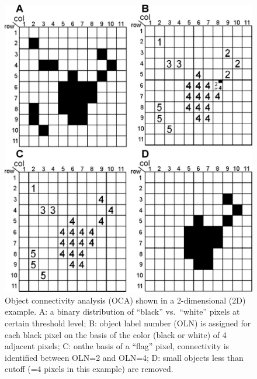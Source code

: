 \begin{figure}[p]
	\centering
	\includegraphics[width=\imsize]{img/Tsuda2008/Tsuda-03}
	\caption[Object connectivity analysis]{Object connectivity analysis (OCA) shown in a 2-dimensional (2D) example. A: a binary distribution of ``black'' vs.\ ``white'' pixels at certain threshold level; B: object label number (OLN) is assigned for each black pixel on the basis of the color (black or white) of 4 adjacent pixels; C: onthe basis of a ``flag'' pixel, connectivity is identified between OLN=2 and OLN=4; D: small objects
less than cutoff (=4 pixels in this example) are removed.}
	\label{fig:oca}
\end{figure}

